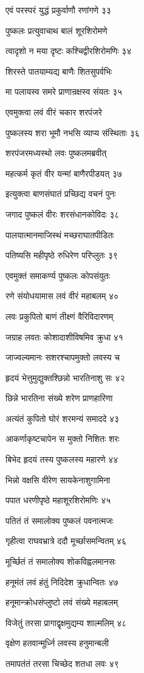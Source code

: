 एवं परस्परं युद्धं प्रकुर्वाणौ रणांगणे ३३

पुष्कलः प्रत्युवाचाथ बालं शूरशिरोमणे

त्वादृशो न मया दृष्टः कश्चिद्वीरशिरोमणिः ३४

शिरस्ते पातयाम्यद्य बाणैः शितसुपर्वभिः

मा पलायस्व समरे प्राणान्रक्षस्व संयतः ३५

एवमुक्त्वा लवं वीरं चकार शरपंजरे

पुष्कलस्य शरा भूमौ नभसि व्याप्य संस्थिताः ३६

शरपंजरमध्यस्थो लवः पुष्कलमब्रवीत्

महत्कर्म कृतं वीर यन्मां बाणैरपीडयत् ३७

इत्युक्त्वा बाणसंघातं प्रच्छिद्य वचनं पुनः

जगाद पुष्कलं वीरः शरसंधानकोविदः ३८

पालयात्मानमाजिस्थं मच्छराघातपीडितः

पतिष्यसि महीपृष्ठे रुधिरेण परिप्लुतः ३९

एवमुक्तं समाकर्ण्य पुष्कलः कोपसंयुतः

रणे संयोधयामास लवं वीरं महाबलम् ४०

लवः प्रकुपितो बाणं तीक्ष्णं वैरिविदारणम्

जग्राह लवतः कोशादाशीविषमिव क्रुधा ४१

जाज्वल्यमानः सशरश्चापमुक्तो लवस्य च

हृदयं भेत्तुमुद्युक्तश्छिन्नो भारतिनाशु सः ४२

छिन्ने भारतिना संख्ये शरेण प्राणहारिणा

अत्यंतं कुपितो घोरं शरमन्यं समाददे ४३

आकर्णाकृष्टचापेन स मुक्तो निशितः शरः

बिभेद हृदयं तस्य पुष्कलस्य महारणे ४४

भिन्नो वक्षसि वीरेण सायकेनाशुगामिना

पपात धरणीपृष्ठे महाशूरशिरोमणिः ४५

पतितं तं समालोक्य पुष्कलं पवनात्मजः

गृहीत्वा राघवभ्रात्रे ददौ मूर्च्छासमन्वितम् ४६

मूर्च्छितं तं समालोक्य शोकविह्वलमानसः

हनूमंतं लवं हंतुं निदिदेश क्रुधान्वितः ४७

हनूमान्क्रोधसंप्लुष्टो लवं संख्ये महाबलम्

विजेतुं तरसा प्रागाद्वृक्षमुद्यम्य शाल्मलिम् ४८

वृक्षेण हतवान्मूर्ध्नि लवस्य हनुमान्बली

तमापतंतं तरसा चिच्छेद शतधा लवः ४९

